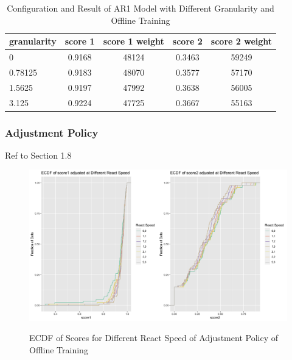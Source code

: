 \documentclass{article}
\begin{document}
\begin{table}[htbp]
  \begin{center}
    \caption{Configuration and Result of AR1 Model with Different Granularity and Offline Training}
    \label{tab:tab1.7.1}
    \begin{tabular}{l|*{4}{c}}
      \textbf{granularity} & \textbf{score 1} & \textbf{score 1 weight} & \textbf{score 2} & \textbf{score 2 weight} \\
      \hline
      0 & 0.9168 & 48124 & 0.3463 & 59249\\
      0.78125 & 0.9183 & 48070 & 0.3577 & 57170\\
      1.5625 & 0.9197 & 47992 & 0.3638 & 56005\\
      3.125 & 0.9224 & 47725 & 0.3667 & 55163\\
    \end{tabular}
  \end{center}
\end{table}

\subsubsection{Adjustment Policy}
Ref to Section 1.8

\begin{figure}
    \caption{ECDF of Scores for Different React Speed of Adjustment Policy of Offline Training}
    \centering
    \includegraphics{images/ECDFofscoresadjustedatDifferentReactSpeedOfAR1,840,3,1.png}
    \label{fig:fig1.8.1}
\end{figure}
\end{document}
